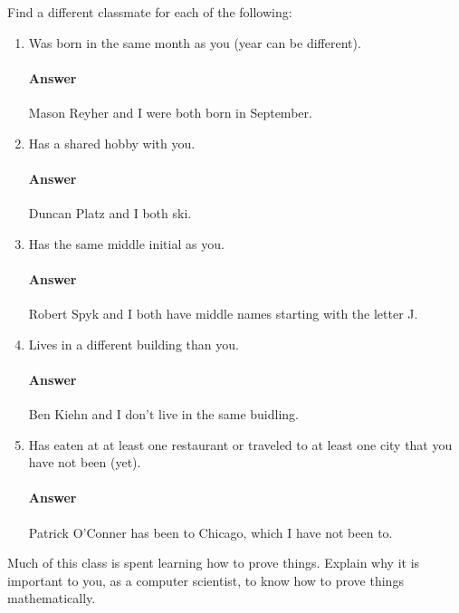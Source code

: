 \documentclass{article}
\begin{document}
Find a different classmate for each of the following:
\begin{enumerate}
    \item Was born in the same month as you (year can be different).
        \paragraph{Answer} Mason Reyher and I were both born in September.

    \item Has a shared hobby with you.
        \paragraph{Answer} Duncan Platz and I both ski.

    \item Has the same middle initial as you.
        \paragraph{Answer} Robert Spyk and I both have middle names starting with the letter J.

    \item Lives in a different building than you.
        \paragraph{Answer} Ben Kiehn and I don't live in the same buidling.

    \item Has eaten at at least one restaurant or traveled to at least one city that you have not been
        (yet).
        \paragraph{Answer} Patrick O'Conner has been to Chicago, which I have not been to.

\end{enumerate}


Much of this class is spent learning how to prove things.  Explain why it is
important to you, as a computer scientist, to know how to prove things
mathematically.
\end{document}
